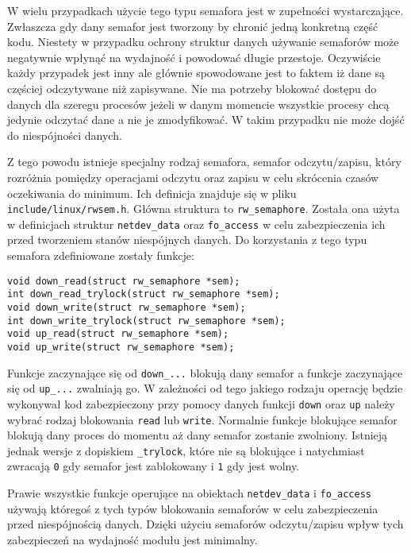 \documentclass[10pt]{article}
\begin{document}
W wielu przypadkach użycie tego typu semafora jest w zupełności wystarczające. Zwłaszcza gdy dany semafor jest tworzony by chronić jedną konkretną część kodu. Niestety w przypadku ochrony struktur danych używanie semaforów może negatywnie wpłynąć na wydajność i powodować długie przestoje. Oczywiście każdy przypadek jest inny ale głównie spowodowane jest to faktem iż dane są częściej odczytywane niż zapisywane. Nie ma potrzeby blokować dostępu do danych dla szeregu procesów jeżeli w danym momencie wszystkie procesy chcą jedynie odczytać dane a nie je zmodyfikować. W takim przypadku nie może dojść do niespójności danych.

Z tego powodu istnieje specjalny rodzaj semafora, semafor odczytu/zapisu, który rozróżnia pomiędzy operacjami odczytu oraz zapisu w celu skrócenia czasów oczekiwania do minimum. Ich definicja znajduje się w pliku \texttt{include/linux/rwsem.h}. Główna struktura to \texttt{rw\_semaphore}. Została ona użyta w definicjach struktur \texttt{netdev\_data} oraz \texttt{fo\_access} w celu zabezpieczenia ich przed tworzeniem stanów niespójnych danych. Do korzystania z tego typu semafora zdefiniowane zostały funkcje:

\begin{verbatim}
void down_read(struct rw_semaphore *sem);
int down_read_trylock(struct rw_semaphore *sem);
void down_write(struct rw_semaphore *sem);
int down_write_trylock(struct rw_semaphore *sem);
void up_read(struct rw_semaphore *sem);
void up_write(struct rw_semaphore *sem);
\end{verbatim}

Funkcje zaczynające się od \texttt{down\_...} blokują dany semafor a funkcje zaczynające się od \texttt{up\_...} zwalniają go. W zależności od tego jakiego rodzaju operację będzie wykonywał kod zabezpieczony przy pomocy danych funkcji \texttt{down} oraz \texttt{up} należy wybrać rodzaj blokowania \texttt{read} lub \texttt{write}. Normalnie funkcje blokujące semafor blokują dany proces do momentu aż dany semafor zostanie zwolniony. Istnieją jednak wersje z dopiskiem \texttt{\_trylock}, które nie są blokujące i natychmiast zwracają \texttt{0} gdy semafor jest zablokowany i \texttt{1} gdy jest wolny.

Prawie wszystkie funkcje operujące na obiektach \texttt{netdev\_data} i \texttt{fo\_access} używają któregoś z tych typów blokowania semaforów w celu zabezpieczenia przed niespójnością danych. Dzięki użyciu semaforów odczytu/zapisu wpływ tych zabezpieczeń na wydajność modułu jest minimalny.
\end{document}

